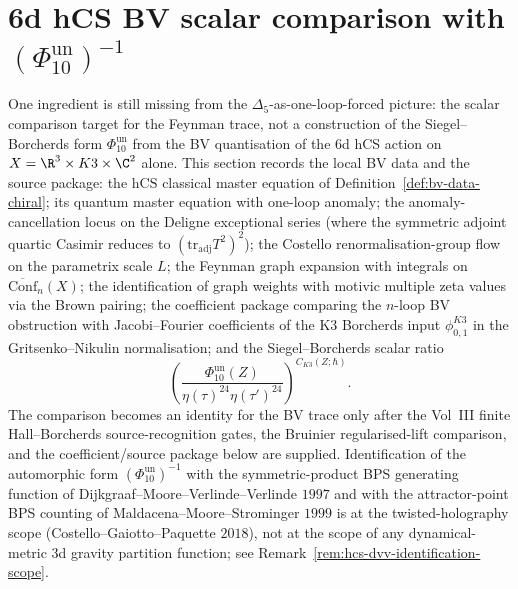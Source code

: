 
\section{6d hCS BV scalar comparison with $(\Phi_{10}^{\mathrm{un}})^{-1}$}
\label{sec:pf-hcs-bv-feynman-trace}

\providecommand{\hCS}{\mathrm{hCS}}
\providecommand{\Conf}{\mathrm{Conf}}
\providecommand{\EndC}{\mathcal{E}}

One ingredient is still missing from the $\Delta_5$-as-one-loop-forced
picture: the scalar comparison target for the Feynman trace, not a
construction of the Siegel--Borcherds form $\Phi_{10}^{\mathrm{un}}$
from the BV quantisation of the 6d hCS action on
$X = \R^3\times K3\times\C^2$ alone. This section records the local
BV data and the source package: the $\hCS$ classical master equation of
Definition~\ref{def:bv-data-chiral}; its quantum master equation with
one-loop anomaly; the anomaly-cancellation locus on the Deligne
exceptional series (where the symmetric adjoint quartic Casimir
reduces to $(\mathrm{tr}_{\mathrm{adj}}T^2)^2$); the Costello
renormalisation-group flow on the parametrix scale $L$; the Feynman
graph expansion with integrals on $\overline{\Conf}_n(X)$; the
identification of graph weights with motivic multiple zeta values via
the Brown pairing; the coefficient package comparing the $n$-loop BV
obstruction with Jacobi--Fourier coefficients of the K3 Borcherds
input $\phi_{0,1}^{K3}$ in the Gritsenko--Nikulin normalisation; and the
Siegel--Borcherds scalar ratio
\[
\left(\frac{\Phi_{10}^{\mathrm{un}}(Z)}
{\eta(\tau)^{24}\eta(\tau')^{24}}\right)^{C_{K3}(Z;\hbar)}.
\]
The comparison becomes an identity for the BV trace only
after the Vol~III finite Hall--Borcherds source-recognition gates, the
Bruinier regularised-lift comparison, and the coefficient/source
package below are supplied. Identification of the automorphic form
$(\Phi_{10}^{\mathrm{un}})^{-1}$ with the symmetric-product BPS
generating function of Dijkgraaf--Moore--Verlinde--Verlinde $1997$
and with the attractor-point BPS counting of
Maldacena--Moore--Strominger $1999$ is at the twisted-holography
scope (Costello--Gaiotto--Paquette $2018$), not at the scope of any
dynamical-metric $3$d gravity partition function; see
Remark~\ref{rem:hcs-dvv-identification-scope}.


